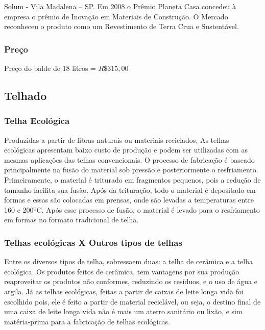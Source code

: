 	Solum - Vila Madalena – SP. Em 2008 o Prêmio Planeta Casa concedeu à empresa o prêmio de Inovação em Materiais de Construção. O Mercado reconheceu o produto como um Revestimento de Terra Crua e Sustentável.  

\subsubsection*{\textbf{Preço}}

	Preço do balde de 18 litros = $R\$ 315,00$


\subsection{Telhado}

\subsubsection*{\textbf{Telha Ecológica}}

	Produzidas a partir de fibras naturais ou materiais reciclados, As telhas ecológicas apresentam baixo custo de produção e podem ser utilizadas com as mesmas aplicações das telhas convencionais.
	O processo de fabricação é baseado principalmente na fusão do material sob pressão e posteriormente o resfriamento. Primeiramente, o material é triturado em fragmentos pequenos, pois a redução de tamanho facilita sua fusão. Após da trituração, todo o material é depositado em formas e essas são colocadas em prensas, onde são levadas a temperaturas entre 160 e 200ºC. Após esse processo de fusão, o material é levado para o resfriamento em formas no formato tradicional de telha.\cite{D.C.Araujo}

\subsubsection*{\textbf{Telhas ecológicas X Outros tipos de telhas}}
Entre os diversos tipos de telha, sobressaem duas: a telha de cerâmica e a telha ecológica. Os produtos feitos de cerâmica, tem vantagens por sua produção reaproveitar os produtos não conformes, reduzindo os resíduos, e o uso de água e argila. Já as telhas ecológicas, feitas a partir de caixas de leite longa vida foi escolhido pois, ele é feito a partir de material reciclável, ou seja, o destino final de uma caixa de leite longa vida não é mais um aterro sanitário ou lixão, e sim matéria-prima para a fabricação de telhas ecológicas.



